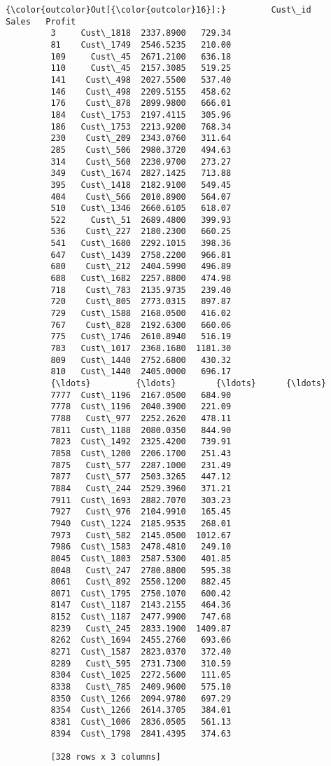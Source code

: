 \documentclass[11pt]{article}
\begin{document}
\begin{Verbatim}[commandchars=\\\{\}]
{\color{outcolor}Out[{\color{outcolor}16}]:}         Cust\_id      Sales   Profit
         3     Cust\_1818  2337.8900   729.34
         81    Cust\_1749  2546.5235   210.00
         109     Cust\_45  2671.2100   636.18
         110     Cust\_45  2157.3085   519.25
         141    Cust\_498  2027.5500   537.40
         146    Cust\_498  2209.5155   458.62
         176    Cust\_878  2899.9800   666.01
         184   Cust\_1753  2197.4115   305.96
         186   Cust\_1753  2213.9200   768.34
         230    Cust\_209  2343.0760   311.64
         285    Cust\_506  2980.3720   494.63
         314    Cust\_560  2230.9700   273.27
         349   Cust\_1674  2827.1425   713.88
         395   Cust\_1418  2182.9100   549.45
         404    Cust\_566  2010.8900   564.07
         510   Cust\_1346  2660.6105   618.07
         522     Cust\_51  2689.4800   399.93
         536    Cust\_227  2180.2300   660.25
         541   Cust\_1680  2292.1015   398.36
         647   Cust\_1439  2758.2200   966.81
         680    Cust\_212  2404.5990   496.89
         688   Cust\_1682  2257.8800   474.98
         718    Cust\_783  2135.9735   239.40
         720    Cust\_805  2773.0315   897.87
         729   Cust\_1588  2168.0500   416.02
         767    Cust\_828  2192.6300   660.06
         775   Cust\_1746  2610.8940   516.19
         783   Cust\_1017  2368.1680  1181.30
         809   Cust\_1440  2752.6800   430.32
         810   Cust\_1440  2405.0000   696.17
         {\ldots}         {\ldots}        {\ldots}      {\ldots}
         7777  Cust\_1196  2167.0500   684.90
         7778  Cust\_1196  2040.3900   221.09
         7788   Cust\_977  2252.2620   478.11
         7811  Cust\_1188  2080.0350   844.90
         7823  Cust\_1492  2325.4200   739.91
         7858  Cust\_1200  2206.1700   251.43
         7875   Cust\_577  2287.1000   231.49
         7877   Cust\_577  2503.3265   447.12
         7884   Cust\_244  2529.3960   371.21
         7911  Cust\_1693  2882.7070   303.23
         7927   Cust\_976  2104.9910   165.45
         7940  Cust\_1224  2185.9535   268.01
         7973   Cust\_582  2145.0500  1012.67
         7986  Cust\_1583  2478.4810   249.10
         8045  Cust\_1803  2587.5300   401.85
         8048   Cust\_247  2780.8800   595.38
         8061   Cust\_892  2550.1200   882.45
         8071  Cust\_1795  2750.1070   600.42
         8147  Cust\_1187  2143.2155   464.36
         8152  Cust\_1187  2477.9900   747.68
         8239   Cust\_245  2833.1900  1409.87
         8262  Cust\_1694  2455.2760   693.06
         8271  Cust\_1587  2823.0370   372.40
         8289   Cust\_595  2731.7300   310.59
         8304  Cust\_1025  2272.5600   111.05
         8338   Cust\_785  2409.9600   575.10
         8350  Cust\_1266  2094.9780   697.29
         8354  Cust\_1266  2614.3705   384.01
         8381  Cust\_1006  2836.0505   561.13
         8394  Cust\_1798  2841.4395   374.63
         
         [328 rows x 3 columns]
\end{Verbatim}
            
\end{document}
